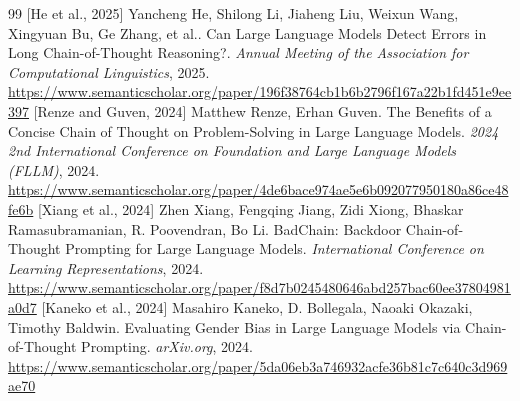\documentclass[11pt]{article}
\begin{document}
\begin{thebibliography}{99}
 [He et al., 2025] Yancheng He, Shilong Li, Jiaheng Liu, Weixun Wang, Xingyuan Bu, Ge Zhang, et al.. Can Large Language Models Detect Errors in Long Chain-of-Thought Reasoning?. \emph{Annual Meeting of the Association for Computational Linguistics}, 2025. \url{https://www.semanticscholar.org/paper/196f38764cb1b6b2796f167a22b1fd451e9ee397}
 [Renze and Guven, 2024] Matthew Renze, Erhan Guven. The Benefits of a Concise Chain of Thought on Problem-Solving in Large Language Models. \emph{2024 2nd International Conference on Foundation and Large Language Models (FLLM)}, 2024. \url{https://www.semanticscholar.org/paper/4de6bace974ae5e6b092077950180a86ce48fe6b}
 [Xiang et al., 2024] Zhen Xiang, Fengqing Jiang, Zidi Xiong, Bhaskar Ramasubramanian, R. Poovendran, Bo Li. BadChain: Backdoor Chain-of-Thought Prompting for Large Language Models. \emph{International Conference on Learning Representations}, 2024. \url{https://www.semanticscholar.org/paper/f8d7b0245480646abd257bac60ee37804981a0d7}
 [Kaneko et al., 2024] Masahiro Kaneko, D. Bollegala, Naoaki Okazaki, Timothy Baldwin. Evaluating Gender Bias in Large Language Models via Chain-of-Thought Prompting. \emph{arXiv.org}, 2024. \url{https://www.semanticscholar.org/paper/5da06eb3a746932acfe36b81c7c640c3d969ae70}
\end{thebibliography}
\end{document}
